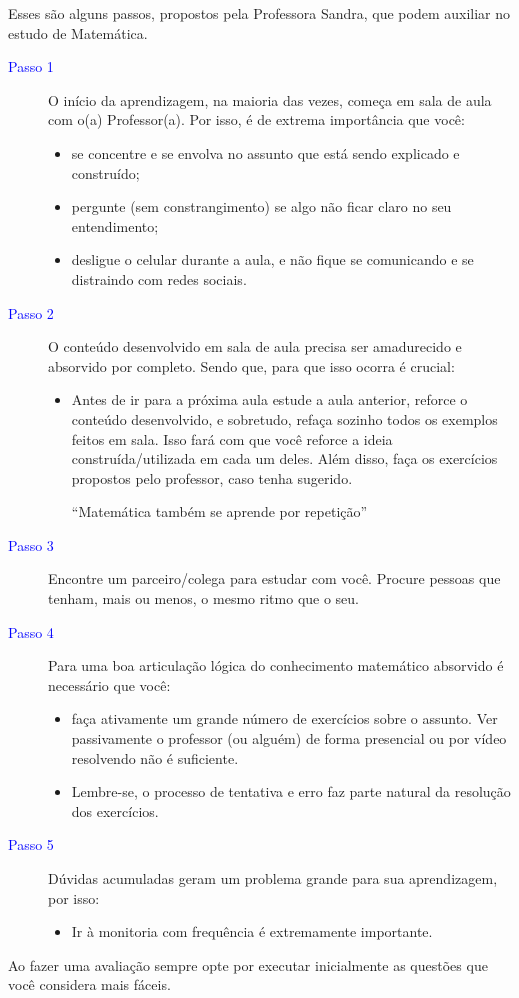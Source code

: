 Esses são alguns passos, propostos pela Professora Sandra, que podem auxiliar no estudo de Matemática.
\begin{description}
    \item[\textcolor{blue}{Passo 1}] O início da aprendizagem, na maioria das vezes, começa em sala de aula com o(a) Professor(a). 
        Por isso, é de extrema importância que você:
        \begin{itemize}
            \item se concentre e se envolva no assunto que está sendo explicado e construído;
            \item pergunte (sem constrangimento) se algo não ficar claro no seu entendimento;
            \item desligue o celular durante a aula, e não fique se comunicando e se distraindo com redes sociais.
        \end{itemize}
    \item[\textcolor{blue}{Passo 2}] O conteúdo desenvolvido em sala de aula precisa ser amadurecido e absorvido por completo. 
        Sendo que, para que isso ocorra é crucial:
        \begin{itemize}
            \item Antes de ir para a próxima aula estude a aula anterior, reforce o conteúdo desenvolvido, 
                e sobretudo, refaça sozinho todos os exemplos feitos em sala. Isso fará com que você reforce 
                a ideia construída/utilizada em cada um deles. Além disso, faça os exercícios propostos pelo 
                professor, caso tenha sugerido. 
                \begin{center}
                    ``Matemática também se aprende por repetição''
                \end{center}
        \end{itemize}
    \item[\textcolor{blue}{Passo 3}] Encontre um parceiro/colega para estudar com você. Procure pessoas que tenham, 
        mais ou menos, o mesmo ritmo que o seu.
    \item[\textcolor{blue}{Passo 4}] Para uma boa articulação lógica do conhecimento matemático absorvido é necessário que você:
        \begin{itemize}
            \item faça ativamente um grande número de exercícios sobre o assunto. Ver passivamente o professor 
                (ou alguém) de forma presencial ou por vídeo resolvendo não é suficiente. 
            \item Lembre-se, o processo de tentativa e erro faz parte natural da resolução dos exercícios.
        \end{itemize}
    \item[\textcolor{blue}{Passo 5}] Dúvidas acumuladas geram um problema grande para sua aprendizagem, por isso:
        \begin{itemize}
            \item Ir à monitoria com frequência é extremamente importante. 
        \end{itemize}
\end{description}
Ao fazer uma avaliação sempre opte por executar inicialmente as questões que você considera mais fáceis.


